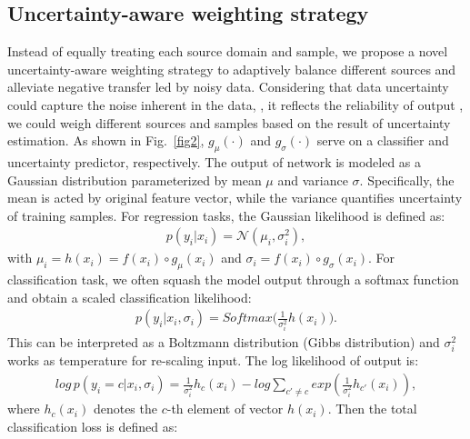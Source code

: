 \documentclass[10pt,twocolumn,letterpaper]{article}
\begin{document}
\subsection{Uncertainty-aware weighting strategy}
\label{sec3.3}
Instead of equally treating each source domain and sample, we propose a novel uncertainty-aware weighting strategy to adaptively balance different sources and alleviate negative transfer led by noisy data. Considering that data uncertainty could capture the noise inherent in the data, \ie, it reflects the reliability of output \cite{kendall2017what,chang2020data}, we could weigh different sources and samples based on the result of uncertainty estimation. As shown in Fig.~\ref{fig2}, $g_{\mu}(\cdot)$ and $g_{\sigma}(\cdot)$ serve on a classifier and uncertainty predictor, respectively. The output of network is modeled as a Gaussian distribution parameterized by mean $\mu$ and variance $\sigma$. Specifically, the mean is acted by original feature vector, while the variance quantifies uncertainty of training samples. For regression tasks, the Gaussian likelihood is defined as:
\begin{align}
	p(y_i|x_i)=\mathcal{N}(\mu_i,\sigma_i^2), 
\end{align}
with $\mu_i = h(x_i)=f(x_i)\circ g_{\mu}(x_i)$ and $\sigma_i = f(x_i)\circ g_{\sigma}(x_i)$. For classification task, we often squash the model output through a softmax function and obtain a scaled classification likelihood:
\begin{align}
	p(y_i|x_i,\sigma_i)=Softmax\bigl(\frac{1}{\sigma_i^2}h(x_i)\bigr).
\end{align}
This can be interpreted as a Boltzmann distribution (Gibbs distribution) and $\sigma_i^2$ works as temperature for re-scaling input. The log likelihood of output is: 
{\small \begin{align}
		log\,p(y_i=c|x_i,\sigma_i)=\frac{1}{\sigma_i^2}h_c(x_i)-log\sum_{c'\neq c}exp(\frac{1}{\sigma_i^2}h_{c'}(x_i)),
\end{align}}where $h_c(x_i)$ denotes the $c$-th element of vector $h(x_i)$. Then the total classification loss is defined as:
\end{document}

